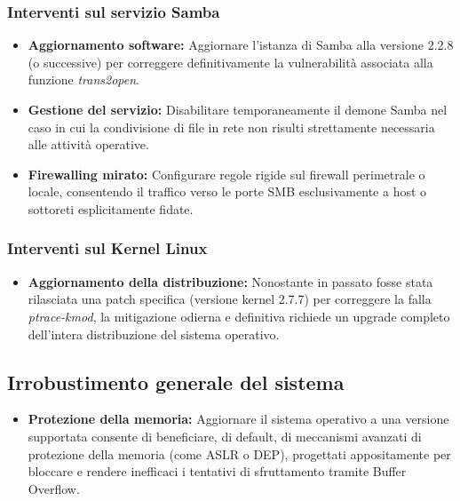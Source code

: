\documentclass[12pt, a4paper]{article}
\begin{document}
	\subsubsection{Interventi sul servizio Samba}
	\begin{itemize}
		\item \textbf{Aggiornamento software:} Aggiornare l'istanza di Samba alla versione 2.2.8 (o successive) per correggere definitivamente la vulnerabilità associata alla funzione \textit{trans2open}.
		\item \textbf{Gestione del servizio:} Disabilitare temporaneamente il demone Samba nel caso in cui la condivisione di file in rete non risulti strettamente necessaria alle attività operative.
		\item \textbf{Firewalling mirato:} Configurare regole rigide sul firewall perimetrale o locale, consentendo il traffico verso le porte SMB esclusivamente a host o sottoreti esplicitamente fidate.
	\end{itemize}

	\subsubsection{Interventi sul Kernel Linux}
	\begin{itemize}
		\item \textbf{Aggiornamento della distribuzione:} Nonostante in passato fosse stata rilasciata una patch specifica (versione kernel 2.7.7) per correggere la falla \textit{ptrace-kmod}, la mitigazione odierna e definitiva richiede un upgrade completo dell'intera distribuzione del sistema operativo.
	\end{itemize}

	\subsection{Irrobustimento generale del sistema}
	\begin{itemize}
		\item \textbf{Protezione della memoria:} Aggiornare il sistema operativo a una versione supportata consente di beneficiare, di default, di meccanismi avanzati di protezione della memoria (come ASLR o DEP), progettati appositamente per bloccare e rendere inefficaci i tentativi di sfruttamento tramite Buffer Overflow.
	\end{itemize}
\end{document}
